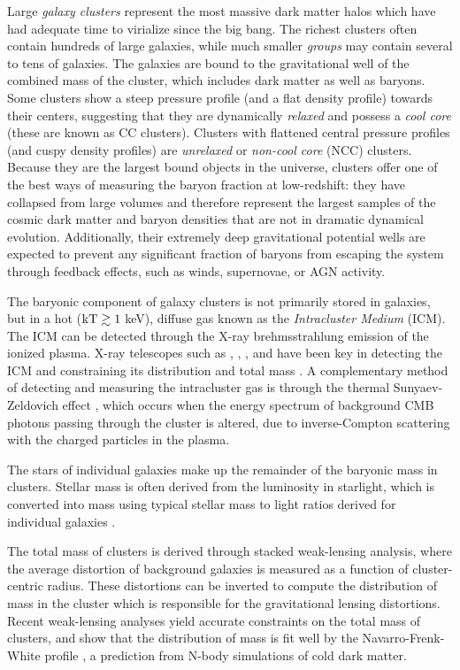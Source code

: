 Large \textit{galaxy clusters} represent the most massive dark matter
halos which have had adequate time to virialize since the big
bang. The richest clusters often contain hundreds of large galaxies,
while much smaller \textit{groups} may contain several to tens of
galaxies. The galaxies are bound to the gravitational well of the
combined mass of the cluster, which includes dark matter as well as
baryons. Some clusters show a steep pressure profile (and a flat
density profile) towards their centers, suggesting that they are
dynamically \textit{relaxed} and possess a \textit{cool core} (these
are known as CC clusters). Clusters with flattened central pressure
profiles (and cuspy density profiles) are \textit{unrelaxed} or
\textit{non-cool core} (NCC) clusters. Because they are the largest
bound objects in the universe, clusters offer one of the best ways of
measuring the baryon fraction at low-redshift: they have collapsed
from large volumes and therefore represent the largest samples of the
cosmic dark matter and baryon densities that are not in dramatic
dynamical evolution. Additionally, their extremely deep gravitational
potential wells are expected to prevent any significant fraction of
baryons from escaping the system through feedback effects, such as
winds, supernovae, or AGN activity.

The baryonic component of galaxy clusters is not primarily stored in
galaxies, but in a hot ($\textrm{kT} \gtrsim 1$ keV), diffuse gas known
as the \textit{Intracluster Medium} (ICM). The ICM can be detected
through the X-ray brehmsstrahlung emission of the ionized
plasma. X-ray telescopes such as \Chandra, \Rosat, \Suzaku, and \XMM{}
have been key in detecting the ICM and constraining its distribution
and total mass . A complementary
method of detecting and measuring the intracluster gas is through the
thermal Sunyaev-Zeldovich effect \citep[SZ,][]{Sunyaev1972}, which
occurs when the energy spectrum of background CMB photons passing
through the cluster is altered, due to inverse-Compton scattering with
the charged particles in the plasma.

The stars of individual galaxies make up the remainder of the baryonic
mass in clusters. Stellar mass is often derived from the luminosity in
starlight, which is converted into mass using typical stellar mass to
light ratios derived for individual galaxies \citep{Bahcall2014}.

The total mass of clusters is derived through stacked weak-lensing
analysis, where the average distortion of background galaxies is
measured as a function of cluster-centric radius. These distortions
can be inverted to compute the distribution of mass in the cluster
which is responsible for the gravitational lensing distortions. Recent
weak-lensing analyses \citep{Mandelbaum2008, Sheldon2009a} yield
accurate constraints on the total mass of clusters, and show that the
distribution of mass is fit well by the Navarro-Frenk-White
profile \citep[NFW,][]{Navarro1996}, a prediction from N-body
simulations of cold dark matter.

